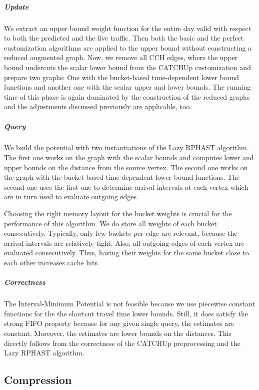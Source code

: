 \documentclass[a4paper,UKenglish,cleveref, autoref, thm-restate,anonymous]{lipics-v2021}
\begin{document}
\subparagraph{Update}
We extract an upper bound weight function for the entire day valid with respect to both the predicted and the live traffic.
Then both the basic and the perfect customization algorithms are applied to the upper bound without constructing a reduced augmented graph.
Now, we remove all CCH edges, where the upper bound undercuts the scalar lower bound from the CATCHUp customization and prepare two graphs:
One with the bucket-based time-dependent lower bound functions and another one with the scalar upper and lower bounds.
The running time of this phase is again dominated by the construction of the reduced graphs and the adjustments discussed previously are applicable, too.


\subparagraph{Query}
We build the potential with two instantiations of the Lazy RPHAST algorithm.
The first one works on the graph with the scalar bounds and computes lower and upper bounds on the distance from the source vertex.
The second one works on the graph with the bucket-based time-dependent lower bound functions.
The second one uses the first one to determine arrival intervals at each vertex which are in turn used to evaluate outgoing edges.

Choosing the right memory layout for the bucket weights is crucial for the performance of this algorithm.
We do store all weights of each bucket consecutively.
Typically, only few buckets per edge are relevant, because the arrival intervals are relatively tight.
Also, all outgoing edges of each vertex are evaluated consecutively.
Thus, having their weights for the same bucket close to each other increases cache hits.


\subparagraph{Correctness}
The Interval-Minimum Potential is not feasible because we use piecewise constant functions for the the shortcut travel time lower bounds.
Still, it does satisfy the strong FIFO property because for any given single query, the estimates are constant.
Moreover, the estimates are lower bounds on the distances.
This directly follows from the correctness of the CATCHUp preprocessing and the Lazy RPHAST algorithm.

\subsection{Compression}\label{sec:compression}
\end{document}
